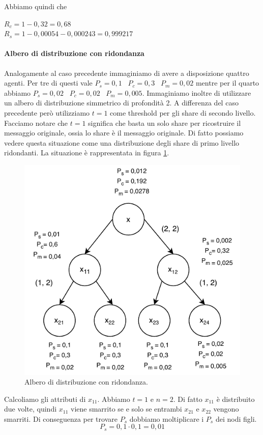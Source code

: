 Abbiamo quindi che
\begin{tightcenter}
	$ R_c = 1 - 0,32 = 0,68 $\\
	$ R_s = 1 - 0,00054 - 0,000243 = 0,999217 $
\end{tightcenter}

\paragraph{Albero di distribuzione con ridondanza}
Analogamente al caso precedente immaginiamo di avere a disposizione quattro agenti. Per tre di questi
vale
$ P_s = 0,1 $ \,
$ P_c = 0,3 $ \,
$ P_m = 0,02 $
mentre per il quarto abbiamo
$ P_s = 0,02 $ \,
$ P_c = 0,02 $ \,
$ P_m = 0,005 $.
Immaginiamo inoltre di utilizzare un albero di distribuzione simmetrico di profondità 2.
A differenza del caso precedente però utilizziamo $ t = 1 $ come threshold per gli share di secondo livello.
Facciamo notare che $ t = 1 $ significa che basta un solo share per ricostruire il messaggio originale,
ossia lo share è il messaggio originale. Di fatto possiamo vedere questa situazione come una
distribuzione degli share di primo livello ridondanti.
La situazione è rappresentata in figura \ref{fig:robustezza-2-2}.

\begin{figure}[H]
	\centering
	\includegraphics[width=0.6\linewidth]{images/chap_analisi_robustezza/robustezza-2-2.pdf}
	\caption{Albero di distribuzione con ridondanza.}
	\label{fig:robustezza-2-2}
\end{figure}

Calcoliamo gli attributi di $ x_{11} $. Abbiamo $ t = 1 $ e $ n = 2 $.
Di fatto $ x_{11} $ è distribuito due volte, quindi
$ x_{11} $ viene smarrito se e solo se entrambi $ x_{21} $ e $ x_{22} $ vengono smarriti.
Di conseguenza per trovare
$ P_s $ dobbiamo moltiplicare i $ P_s $ dei nodi figli.
$$ P_s = 0,1 \cdot 0,1 = 0,01 $$


